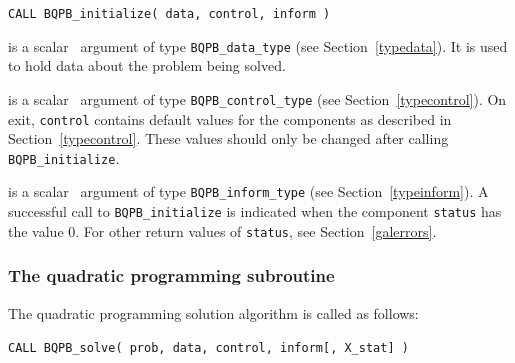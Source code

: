 \documentclass{galahad}
\newcommand{\packagename}{BQPB}
\begin{document}
\hspace{8mm}
{\tt CALL \packagename\_initialize( data, control, inform )}

\vspace*{-3mm}
\begin{description}

 is a scalar \intentinout\ argument of type
{\tt \packagename\_data\_type}
(see Section~\ref{typedata}). It is used to hold data about the problem being
solved.

 is a scalar \intentout\ argument of type
{\tt \packagename\_control\_type}
(see Section~\ref{typecontrol}).
On exit, {\tt control} contains default values for the components as
described in Section~\ref{typecontrol}.
These values should only be changed after calling
{\tt \packagename\_initialize}.

 is a scalar \intentout\ argument of type
{\tt \packagename\_inform\_type}
(see Section~\ref{typeinform}). A successful call to
{\tt \packagename\_initialize}
is indicated when the  component {\tt status} has the value 0.
For other return values of {\tt status}, see Section~\ref{galerrors}.

\end{description}


\subsubsection{The quadratic programming subroutine}\label{qps}
The quadratic programming solution algorithm is called as follows:
\vspace*{1mm}

\hspace{8mm}
{\tt CALL \packagename\_solve( prob, data, control, inform[, X\_stat] )}
\end{document}
